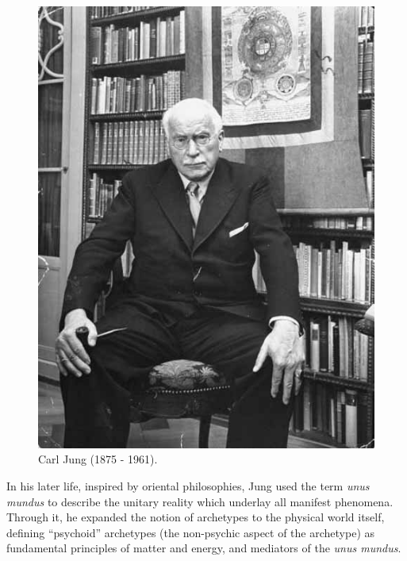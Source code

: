 \documentclass[
]{book}
\begin{document}
\begin{figure}

{\centering \includegraphics[width=\textwidth]{img/jung} 

}

\caption{Carl Jung (1875 - 1961).}\label{fig:unnamed-chunk-6}
\end{figure}

In his later life, inspired by oriental philosophies, Jung used the term \emph{unus mundus} to describe the unitary reality which underlay all manifest phenomena. Through it, he expanded the notion of archetypes to the physical world itself, defining ``psychoid'' archetypes (the non-psychic aspect of the archetype) as fundamental principles of matter and energy, and mediators of the \emph{unus mundus}.
\end{document}
